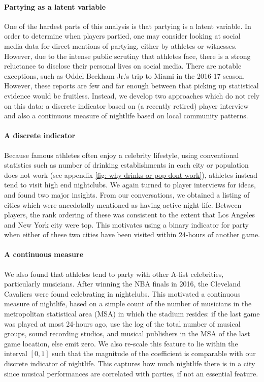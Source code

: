 \documentclass[letterpaper,12pt]{article}
\begin{document}
\paragraph{Partying as a latent variable}
One of the hardest parts of this analysis is that partying is a latent variable.
In order to determine when players partied, one may consider looking at social media data for direct mentions of partying, either by athletes or witnesses. However, due to the intense public scrutiny that athletes face, there is a strong reluctance to disclose their personal lives on social media. There are notable exceptions, such
as Oddel Beckham Jr.'s trip to Miami in the 2016-17 season.\citep{bieler, bleler}
However, these reports are few and far enough between that picking up statistical evidence would be fruitless.
Instead, we develop two approaches which do not rely on this data: a discrete indicator 
based on (a recently retired) player interview and also a continuous measure of nightlife based on local community patterns.

\paragraph{A discrete indicator}
Because famous athletes often enjoy a celebrity lifestyle, using conventional statistics
such as number of drinking establishments in each city or population does not work (see appendix \ref{fig: why drinks or pop dont work}), athletes instead
tend to visit high end nightclubs. We again turned to player interviews for ideas,
and found two major insights. From our conversations, 
we obtained a listing of cities which were anecdotally
mentioned as having active night-life. Between players, the rank ordering of these
was consistent to the extent that Los Angeles and New York city were top. 
This motivates using a binary indicator for party when either of these two cities have been visited within 24-hours of another game. 

\paragraph{A continuous measure}
We also found that athletes tend to party with other A-list celebrities,
particularly musicians.\citep{jbutlerdwade} After winning the NBA finals
in 2016, the Cleveland Cavaliers were found celebrating in nightclubs.\citep{xsclub} 
This motivated a continuous measure of nightlife, based on a simple count of the number of musicians in the metropolitan statistical area (MSA) 
in which the stadium resides: if the last game was played at most 24-hours ago, use the log of the total number
of musical groups, sound recording studios, and musical publishers in the MSA of the 
last game location, else emit zero.  We also re-scale this feature to lie within the
interval $[0,1]$ such that the magnitude of the coefficient is comparable with our
discrete indicator of nightlife.
This captures how much nightlife there is in a city since musical performances are correlated
with parties, if not an essential feature.
\end{document}
